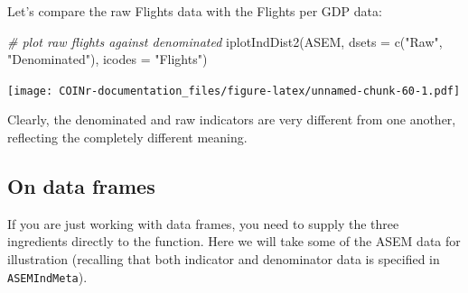 \documentclass[
]{book}
\newenvironment{Shaded}{\begin{snugshade}}{\end{snugshade}}
\newcommand{\AttributeTok}[1]{\textcolor[rgb]{0.77,0.63,0.00}{#1}}
\newcommand{\CommentTok}[1]{\textcolor[rgb]{0.56,0.35,0.01}{\textit{#1}}}
\newcommand{\FunctionTok}[1]{\textcolor[rgb]{0.00,0.00,0.00}{#1}}
\newcommand{\NormalTok}[1]{#1}
\newcommand{\StringTok}[1]{\textcolor[rgb]{0.31,0.60,0.02}{#1}}
\begin{document}
Let's compare the raw Flights data with the Flights per GDP data:

\begin{Shaded}
\begin{Highlighting}[]
\CommentTok{\# plot raw flights against denominated}
\FunctionTok{iplotIndDist2}\NormalTok{(ASEM, }\AttributeTok{dsets =} \FunctionTok{c}\NormalTok{(}\StringTok{"Raw"}\NormalTok{, }\StringTok{"Denominated"}\NormalTok{), }\AttributeTok{icodes =} \StringTok{"Flights"}\NormalTok{)}
\end{Highlighting}
\end{Shaded}

\texttt{[image: COINr-documentation\_files/figure-latex/unnamed-chunk-60-1.pdf]}

Clearly, the denominated and raw indicators are very different from one another, reflecting the completely different meaning.

\hypertarget{on-data-frames}{%
\subsection{On data frames}\label{on-data-frames}}

If you are just working with data frames, you need to supply the three ingredients directly to the function. Here we will take some of the ASEM data for illustration (recalling that both indicator and denominator data is specified in \texttt{ASEMIndMeta}).
\end{document}
